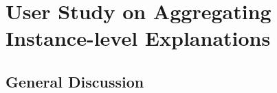 \chapter{User Study on Aggregating Instance-level Explanations}
\label{chap:aggexplain}


\section{General Discussion}
